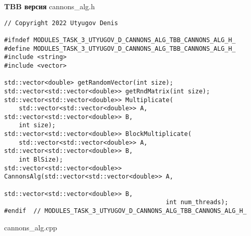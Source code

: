 \documentclass{report}
\begin{document}
\textbf{TBB версия}
\newline
\newline cannons\_alg.h
\begin{lstlisting}
// Copyright 2022 Utyugov Denis

#ifndef MODULES_TASK_3_UTYUGOV_D_CANNONS_ALG_TBB_CANNONS_ALG_H_
#define MODULES_TASK_3_UTYUGOV_D_CANNONS_ALG_TBB_CANNONS_ALG_H_
#include <string>
#include <vector>

std::vector<double> getRandomVector(int size);
std::vector<std::vector<double>> getRndMatrix(int size);
std::vector<std::vector<double>> Multiplicate(
    std::vector<std::vector<double>> A, std::vector<std::vector<double>> B,
    int size);
std::vector<std::vector<double>> BlockMultiplicate(
    std::vector<std::vector<double>> A, std::vector<std::vector<double>> B,
    int BlSize);
std::vector<std::vector<double>> CannonsAlg(std::vector<std::vector<double>> A,
                                            std::vector<std::vector<double>> B,
                                            int num_threads);
#endif  // MODULES_TASK_3_UTYUGOV_D_CANNONS_ALG_TBB_CANNONS_ALG_H_

\end{lstlisting}
cannons\_alg.cpp
\end{document}
